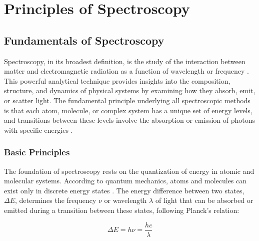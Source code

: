 \chapter{Principles of Spectroscopy} %

\label{chap:spectroscopy} %


\section{Fundamentals of Spectroscopy}
\label{sec:spectroscopy_fundamentals}

\noindent Spectroscopy, in its broadest definition, is the study of the interaction between matter and electromagnetic radiation as a function of wavelength or frequency \cite{Mukamel1995PrinciplesNonlinearOptical}.
This powerful analytical technique provides insights into the composition, structure, and dynamics of physical systems by examining how they absorb, emit, or scatter light. The fundamental principle underlying all spectroscopic methods is that each atom, molecule, or complex system has a unique set of energy levels, and transitions between these levels involve the absorption or emission of photons with specific energies \cite{Boyd2008Chapter1Nonlinear}.

\subsection{Basic Principles}
\label{subsec:basic_principles}

\noindent The foundation of spectroscopy rests on the quantization of energy in atomic and molecular systems. According to quantum mechanics, atoms and molecules can exist only in discrete energy states \cite{AlbashEtAl2012QuantumAdiabaticMarkovian}. The energy difference between two states, $\Delta E$, determines the frequency $\nu$ or wavelength $\lambda$ of light that can be absorbed or emitted during a transition between these states, following Planck's relation:

\begin{equation}
    \Delta E = h\nu = \frac{hc}{\lambda}
    \label{eq:planck_relation}
\end{equation}

